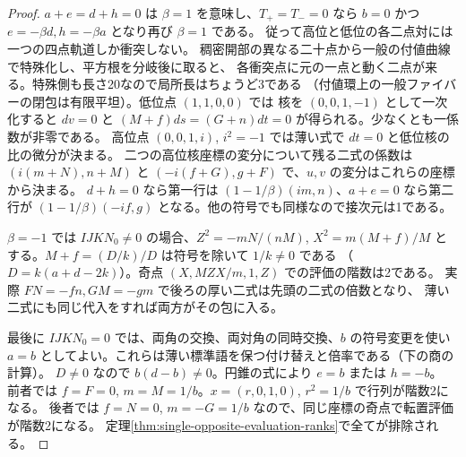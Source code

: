 \begin{proof}
$a+e=d+h=0$ は $\beta=1$ を意味し、$T_+=T_-=0$ なら $b=0$ かつ
$e=-\beta d,h=-\beta a$ となり再び $\beta=1$ である。
従って高位と低位の各二点対には一つの四点軌道しか衝突しない。
稠密開部の異なる二十点から一般の付値曲線で特殊化し、平方根を分岐後に取ると、
各衝突点に元の一点と動く二点が来る。特殊側も長さ20なので局所長はちょうど3である
（付値環上の一般ファイバーの閉包は有限平坦）。低位点 $(1,1,0,0)$ では
核を $(0,0,1,-1)$ として一次化すると $dv=0$ と
$(M+f)ds=(G+n)dt=0$ が得られる。少なくとも一係数が非零である。
高位点 $(0,0,1,i)$, $i^2=-1$ では薄い式で $dt=0$ と低位核の比の微分が決まる。
二つの高位核座標の変分について残る二式の係数は
$(i(m+N),n+M)$ と $(-i(f+G),g+F)$ で、$u,v$ の変分はこれらの座標から決まる。
$d+h=0$ なら第一行は $(1-1/\beta)(im,n)$、$a+e=0$ なら第二行が
$(1-1/\beta)(-if,g)$ となる。他の符号でも同様なので接次元は1である。

$\beta=-1$ では $I J K N_0\ne0$ の場合、$Z^2=-mN/(nM)$,
$X^2=m(M+f)/M$ とする。$M+f=(D/k)/D$ は符号を除いて $1/k\ne0$ である
（$D=k(a+d-2k)$）。奇点 $(X,MZX/m,1,Z)$ での評価の階数は2である。
実際 $FN=-fn,GM=-gm$ で後ろの厚い二式は先頭の二式の倍数となり、
薄い二式にも同じ代入をすれば両方がその包に入る。

最後に $I J K N_0=0$ では、両角の交換、両対角の同時交換、$b$ の符号変更を使い
$a=b$ としてよい。これらは薄い標準語を保つ付け替えと倍率である（下の商の計算）。
$D\ne0$ なので $b(d-b)\ne0$。円錐の式により $e=b$ または $h=-b$。
前者では $f=F=0$, $m=M=1/b$。$x=(r,0,1,0)$, $r^2=1/b$ で行列が階数2になる。
後者では $f=N=0$, $m=-G=1/b$ なので、同じ座標の奇点で転置評価が階数2になる。
定理\ref{thm:single-opposite-evaluation-ranks}で全てが排除される。
\end{proof}

